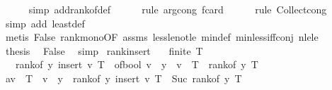 \begin{isabellebody}
\ \ \ \ \isamarkupfalse%
\ {\isacharparenleft}{\kern0pt}simp\ add{\isacharcolon}{\kern0pt}rank{\isacharunderscore}{\kern0pt}of{\isacharunderscore}{\kern0pt}def{\isacharparenright}{\kern0pt}\isanewline
\ \ \ \ \isamarkupfalse%
\ {\isacharparenleft}{\kern0pt}rule\ arg{\isacharunderscore}{\kern0pt}cong{\isacharbrackleft}{\kern0pt}\ f{\isacharequal}{\kern0pt}{\isachardoublequoteopen}card{\isachardoublequoteclose}{\isacharbrackright}{\kern0pt}{\isacharparenright}{\kern0pt}\isanewline
\ \ \ \ \isamarkupfalse%
\ {\isacharparenleft}{\kern0pt}rule\ Collect{\isacharunderscore}{\kern0pt}cong{\isacharparenright}{\kern0pt}\isanewline
\ \ \ \ \isamarkupfalse%
\ {\isacharparenleft}{\kern0pt}simp\ add{\isacharcolon}{\kern0pt}\ least{\isacharunderscore}{\kern0pt}def{\isacharparenright}{\kern0pt}\isanewline
\ \ \ \ \isamarkupfalse%
\ {\isacharparenleft}{\kern0pt}metis\ False\ rank{\isacharunderscore}{\kern0pt}mono{\isacharbrackleft}{\kern0pt}OF\ assms{\isacharbrackright}{\kern0pt}\ less{\isacharunderscore}{\kern0pt}le{\isacharunderscore}{\kern0pt}not{\isacharunderscore}{\kern0pt}le\ min{\isacharunderscore}{\kern0pt}def\ min{\isacharunderscore}{\kern0pt}less{\isacharunderscore}{\kern0pt}iff{\isacharunderscore}{\kern0pt}conj\ nle{\isacharunderscore}{\kern0pt}le{\isacharparenright}{\kern0pt}\isanewline
\ \ \isamarkupfalse%
\ {\isacharquery}{\kern0pt}thesis\ \isamarkupfalse%
\ False\ \isamarkupfalse%
\ simp\isanewline
{}\isamarkupfalse%
%
\endisatagproof
{\isafoldproof}%
%
\isadelimproof
\isanewline
%
\endisadelimproof
\isanewline
{}\isamarkupfalse%
\ rank{\isacharunderscore}{\kern0pt}insert{\isacharcolon}{\kern0pt}\isanewline
\ \ \ {\isachardoublequoteopen}finite\ T{\isachardoublequoteclose}\isanewline
\ \ \ {\isachardoublequoteopen}rank{\isacharunderscore}{\kern0pt}of\ y\ {\isacharparenleft}{\kern0pt}insert\ v\ T{\isacharparenright}{\kern0pt}\ {\isacharequal}{\kern0pt}\ of{\isacharunderscore}{\kern0pt}bool\ {\isacharparenleft}{\kern0pt}v\ {\isacharless}{\kern0pt}\ y\ {\isasymand}\ v\ {\isasymnotin}\ T{\isacharparenright}{\kern0pt}\ {\isacharplus}{\kern0pt}\ rank{\isacharunderscore}{\kern0pt}of\ y\ T{\isachardoublequoteclose}\isanewline
%
\isadelimproof
%
\endisadelimproof
%
\isatagproof
{}\isamarkupfalse%
\ {\isacharminus}{\kern0pt}\isanewline
\ \ \isamarkupfalse%
\ a{\isacharcolon}{\kern0pt}{\isachardoublequoteopen}v\ {\isasymnotin}\ T\ {\isasymLongrightarrow}\ v\ {\isacharless}{\kern0pt}\ y\ {\isasymLongrightarrow}\ rank{\isacharunderscore}{\kern0pt}of\ y\ {\isacharparenleft}{\kern0pt}insert\ v\ T{\isacharparenright}{\kern0pt}\ {\isacharequal}{\kern0pt}\ Suc\ {\isacharparenleft}{\kern0pt}rank{\isacharunderscore}{\kern0pt}of\ y\ T{\isacharparenright}{\kern0pt}{\isachardoublequoteclose}\isanewline

\end{isabellebody}
